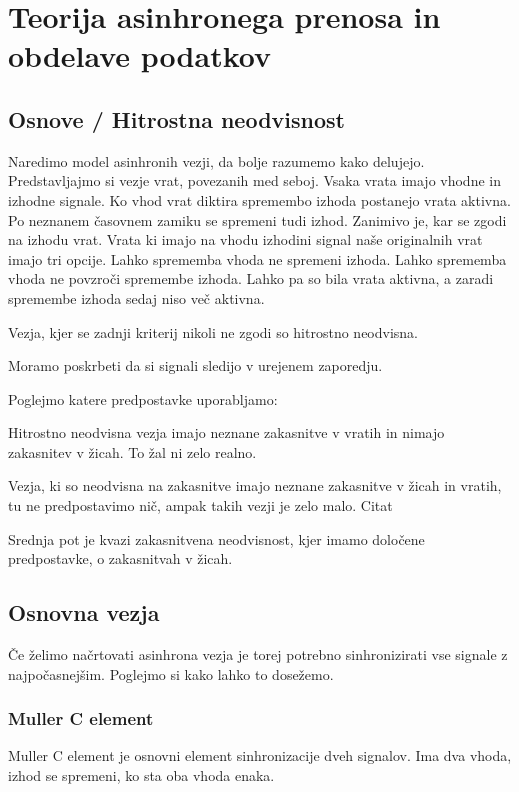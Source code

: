\section{Teorija asinhronega prenosa in obdelave podatkov} \label{a}


\subsection{Osnove / Hitrostna neodvisnost} \label{b}

Naredimo model asinhronih vezji, da bolje razumemo kako delujejo. Predstavljajmo si vezje vrat, povezanih med seboj. Vsaka vrata imajo vhodne in izhodne signale. Ko vhod vrat diktira spremembo izhoda postanejo vrata aktivna. Po neznanem časovnem zamiku se spremeni tudi izhod. Zanimivo je, kar se zgodi na izhodu vrat. Vrata ki imajo na vhodu izhodini signal naše originalnih vrat imajo tri opcije.
Lahko sprememba vhoda ne spremeni izhoda.
Lahko sprememba vhoda ne povzroči spremembe izhoda.
Lahko pa so bila vrata aktivna, a zaradi spremembe izhoda sedaj niso več aktivna.

Vezja, kjer se zadnji kriterij nikoli ne zgodi so hitrostno neodvisna.

Moramo poskrbeti da si signali sledijo v urejenem zaporedju.


Poglejmo katere predpostavke uporabljamo:

Hitrostno neodvisna vezja imajo neznane zakasnitve v vratih in nimajo zakasnitev v žicah. To žal ni zelo realno.

Vezja, ki so neodvisna na zakasnitve imajo neznane zakasnitve v žicah in vratih, tu ne predpostavimo nič, ampak takih vezji je zelo malo. Citat

Srednja pot je kvazi zakasnitvena neodvisnost, kjer imamo določene predpostavke, o zakasnitvah v žicah.






\subsection{Osnovna vezja} \label{b}
Če želimo načrtovati asinhrona vezja je torej potrebno sinhronizirati vse signale z najpočasnejšim. Poglejmo si kako lahko to dosežemo.

\subsubsection{Muller C element} \label{c}
Muller C element je osnovni element sinhronizacije dveh signalov. Ima dva vhoda, izhod se spremeni, ko sta oba vhoda enaka.

